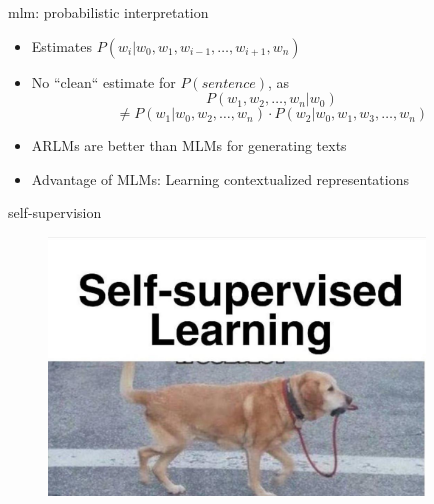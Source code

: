 
\begin{vbframe}{mlm: probabilistic interpretation}

\vfill

\begin{itemize}
	\item Estimates $P(w_i | w_0, w_1, w_{i-1}, \dots, w_{i+1}, w_n)$
	\item No ``clean`` estimate for $P(sentence)$, as
	$$ P(w_1, w_2, \dots, w_n | w_0)$$ $$\neq P(w_1 | w_0, w_2, \dots, w_n) \cdot P(w_2 | w_0, w_1, w_3, \dots, w_n)$$
	\item ARLMs are better than MLMs for generating texts 
	\item Advantage of MLMs: Learning contextualized representations
\end{itemize}

\vfill

\end{vbframe}


\begin{vbframe}{self-supervision}

\vfill

	\begin{figure}
		\centering
		\includegraphics[width=10cm]{figure/selfsup.jpeg}
	\end{figure}
	
\vfill

\end{vbframe}


